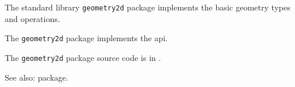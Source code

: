 
The standard library {\tt geometry2d} package implements the basic geometry types and operations.

The {\tt geometry2d} package implements the  api.

The {\tt geometry2d} package source code is in .

See also:   package.
